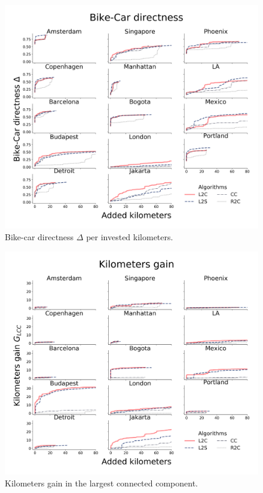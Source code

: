 \begin{figure}[h!]
  \centering
  \includegraphics[width=\textwidth]{images/datadriven/SI_Directness_Bike_Streets.png}
  \caption{Bike-car directness $\Delta$ per invested kilometers.}
  \label{fig:Directness_BikeStreets}
\end{figure}

\begin{figure}[h!]
  \centering
  \includegraphics[width=\textwidth]{images/datadriven/SI_Gain_Bike_Streets.png}
  \caption{Kilometers gain in the largest connected component.}
  \label{fig:Gain_BikeStreets}
\end{figure}

